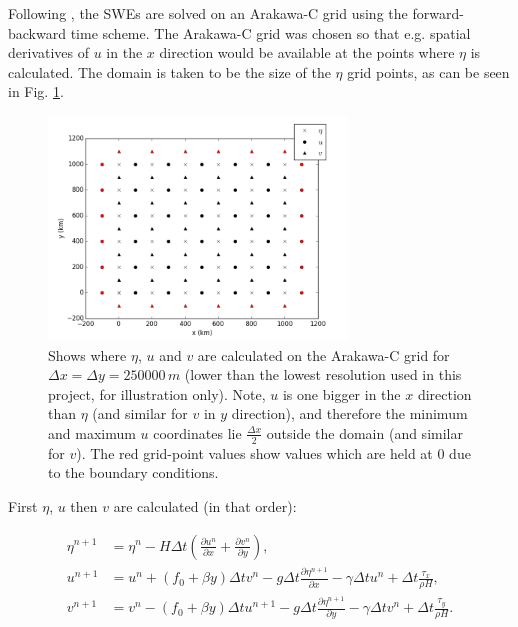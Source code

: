 \documentclass{article}
\begin{document}
Following \textcite{beckers1993stability}, the SWEs are solved on an Arakawa-C grid using the
forward-backward time scheme. The Arakawa-C grid was chosen so that e.g. spatial derivatives of $u$
in the $x$ direction would be available at the points where $\eta$ is calculated. The domain is
taken to be the size of the $\eta$ grid points, as can be seen in Fig. \ref{fig:arakawa_c_grid}.

\begin{figure}[ht!]
    \centering
    \includegraphics[width=300px]{figures/arakawa_c_grid}
    \caption{Shows where $\eta$, $u$ and $v$ are calculated on the Arakawa-C grid for $\Delta x =
	\Delta y = 250000\, m$ (lower than the lowest resolution used in this project, for
	illustration only). Note, $u$ is one bigger in the $x$ direction than $\eta$ (and similar
	for $v$ in $y$ direction), and therefore the minimum and maximum $u$ coordinates lie
	$\frac{\Delta x}{2}$ outside the domain (and similar for $v$). The red grid-point values
	show values which are held at $0$ due to the boundary conditions. }
    \label{fig:arakawa_c_grid}
\end{figure}

First $\eta$, $u$ then $v$ are calculated (in that order):

\begin{align}
    \label{eqn:swe_arakawa1} 
    \eta^{n+1} & =  \eta^n- H \Delta t (\frac{\partial u^n}{\partial x} + \frac{\partial v^n}{\partial y} ),  \\
    \label{eqn:swe_arakawa2} 
    u^{n+1} & = u^n + (f_0 + \beta y) \Delta t v^n - g \Delta t \frac{\partial \eta^{n+1}}{\partial
    x} - \gamma \Delta t u^n + \Delta t \frac{\tau_x}{\rho H}, \\
    \label{eqn:swe_arakawa3} 
    v^{n+1} & = v^n - (f_0 + \beta y) \Delta t u^{n+1} - g \Delta t \frac{\partial \eta^{n+1}}{\partial y} -
    \gamma \Delta t v^n + \Delta t \frac{\tau_y}{\rho H}.
\end{align}
\end{document}
